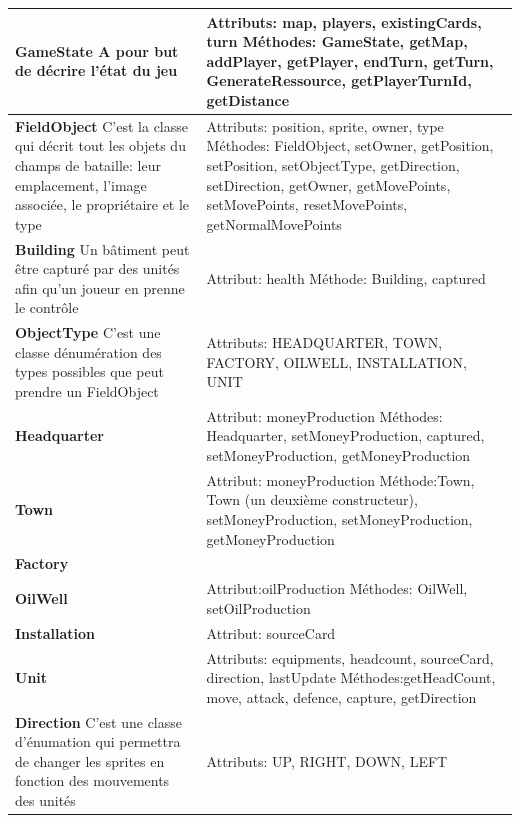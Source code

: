 \newpage
\phantom{Texte invisible parce que j'ai pas trouvé d'autre méthode pour mettre le tableau à la ligne.}

\begin{tabularx}{15 cm}{|X|X|}
\hline
\textbf{GameState} \newline A pour but de décrire l'état du jeu & Attributs: map, players, existingCards, turn \newline Méthodes: GameState, getMap, addPlayer, getPlayer, endTurn, getTurn, GenerateRessource, getPlayerTurnId, getDistance\\ 
\hline
\textbf{FieldObject} \newline C'est la classe qui décrit tout les objets du champs de bataille: leur emplacement, l'image associée, le propriétaire et le type  & Attributs: position, sprite, owner, type \newline Méthodes: FieldObject, setOwner, getPosition, setPosition, setObjectType, getDirection, setDirection, getOwner, getMovePoints, setMovePoints, resetMovePoints, getNormalMovePoints\\
\hline
\textbf{Building} \newline Un bâtiment peut être capturé par des unités afin qu'un joueur en prenne le contrôle & Attribut: health \newline Méthode: Building, captured\\
\hline
\textbf{ObjectType} \newline C'est une classe dénumération des types possibles que peut prendre un FieldObject & Attributs: HEADQUARTER, TOWN, FACTORY, OILWELL, INSTALLATION, UNIT \newline \\
\hline
\textbf{Headquarter} & Attribut: moneyProduction \newline Méthodes: Headquarter, setMoneyProduction, captured, setMoneyProduction, getMoneyProduction\\
\hline
\textbf{Town} & Attribut: moneyProduction \newline Méthode:Town, Town (un deuxième constructeur), setMoneyProduction, setMoneyProduction, getMoneyProduction\\
\hline
\textbf{Factory} &  
\newline\\
\hline
\textbf{OilWell} & Attribut:oilProduction \newline Méthodes: OilWell, setOilProduction\\
\hline
\textbf{Installation} & Attribut: sourceCard \newline\\
\hline
\textbf{Unit} & Attributs: equipments, headcount, sourceCard, direction, lastUpdate \newline Méthodes:getHeadCount, move, attack, defence, capture, getDirection\\

\hline
\textbf{Direction} \newline C'est une classe d'énumation qui permettra de changer les sprites en fonction des mouvements des unités & Attributs: UP, RIGHT, DOWN, LEFT \newline \\
\hline

\end{tabularx}
